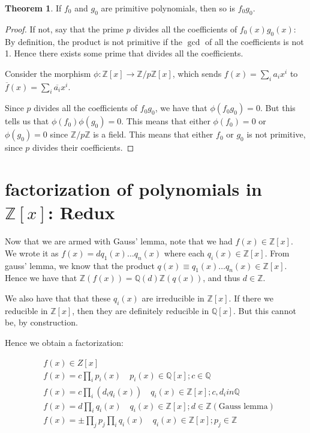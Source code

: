 \documentclass{book}
\newcommand{\Z}{\ensuremath{\mathbb{Z}}}
\newcommand{\Q}{\ensuremath{\mathbb{Q}}}
\theoremstyle{definition}
\newtheorem{theorem}{Theorem}
\begin{document}
\begin{theorem}
    If $f_0$ and $g_0$ are primitive polynomials, then so is $f_0 g_0$.
\end{theorem}
\begin{proof}
    If not, say that the prime $p$ divides all the coefficients of $f_0(x) g_0(x)$:
    By definition, the product is not primitive if the $\gcd$ of all the coefficients
    is not 1. Hence there exists some prime that divides all the coefficients.


    Consider the morphism $\phi: \Z[x] \rightarrow \Z/p\Z[x]$, which sends $f(x) = \sum_i a_i x^i$
    to $\overline{f}(x) = \sum_i \overline{a_i}x^i$.

    Since $p$ divides all the coefficients of $f_0 g_0$, we have that $\phi(f_0 g_0) = 0$.
    But this tells us that $\phi(f_0) \phi(g_0) = 0$. This means that either $\phi(f_0) = 0$
    or $\phi(g_0) = 0$ since $\Z/p\Z$ is a field. This means that either $f_0$
    or $g_0$ is not primitive, since $p$ divides their coefficients.
\end{proof}


\section{factorization of polynomials in $\Z[x]$: Redux}
Now that we are armed with Gauss' lemma, note that we had $f(x) \in \Z[x]$.
We wrote it as $f(x) = d q_1(x) \dots q_n(x)$ where each $q_i(x) \in \Z[x]$.
From gauss' lemma, we know that the product
$q(x) \equiv q_1(x) \dots q_n(x) \in \Z[x]$.
Hence we have that $\Z (f(x)) = \Q(d) \Z (q(x))$, and thus $d \in \Z$.


We also have that that these $q_i(x)$ are irreducible in $\Z[x]$. If there we
reducible in $\Z[x]$, then they are definitely reducible in $\Q[x]$. But this
cannot be, by construction.

Hence we obtain a factorization:

\begin{align*}
&f(x) \in Z[x] \\
&f(x) = c \prod_i p_i(x) \quad p_i(x) \in \Q[x]; c \in \Q \\
&f(x) = c \prod_i (d_i q_i(x)) \quad q_i(x) \in \Z[x]; c, d_i in \Q \\
&f(x) = d \prod_i q_i(x) \quad q_i(x) \in \Z[x]; d \in \Z (\text{Gauss lemma})\\
&f(x) = \pm \prod_j p_j \prod_i q_i(x) \quad q_i(x) \in \Z[x]; p_j \in \Z 
\end{align*}
\end{document}
